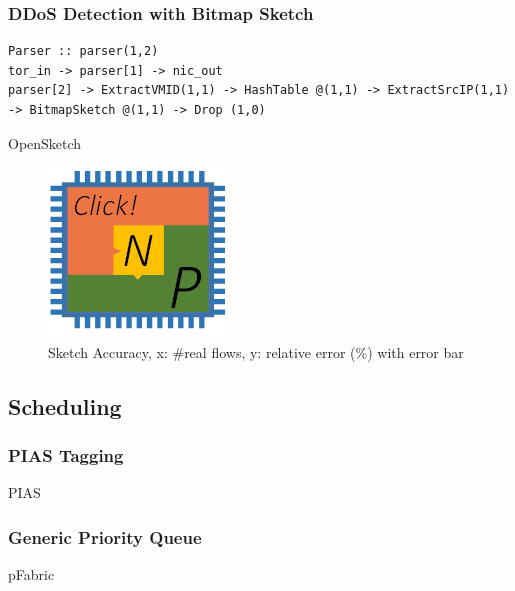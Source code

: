 {\subsubsection{DDoS Detection with Bitmap Sketch}

\begin{lstlisting}
Parser :: parser(1,2)
tor_in -> parser[1] -> nic_out
parser[2] -> ExtractVMID(1,1) -> HashTable @(1,1) -> ExtractSrcIP(1,1) -> BitmapSketch @(1,1) -> Drop (1,0)
\end{lstlisting}

OpenSketch \cite{yu2013software}

\begin{figure}[h!]
	\centering
	\includegraphics[width=0.6\columnwidth]{image/logo}
	\vspace{-0.15in}
	\caption{Sketch Accuracy, x: \#real flows, y: relative error (\%) with error bar}
	\vspace{-0.15in}
	\label{clicknp:fig:SketchAccuracy}
\end{figure}


\subsection{Scheduling}

\subsubsection{PIAS Tagging}

PIAS \cite{bai2014pias}

\subsubsection{Generic Priority Queue}

pFabric \cite{alizadeh2013pfabric}

}
